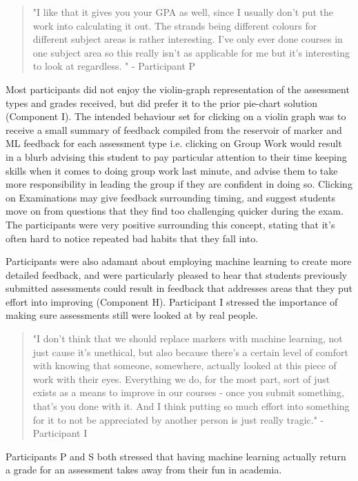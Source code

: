 \documentclass{l4proj}
\begin{document}
\begin{quote}
    "I like that it gives you your GPA as well, since I usually don't put the work into calculating it out. The strands being different colours for different subject areas is rather interesting. I've only ever done courses in one subject area so this really isn't as applicable for me but it's interesting to look at regardless. " - Participant P
\end{quote}

Most participants did not enjoy the violin-graph representation of the assessment types and grades received, but did prefer it to the prior pie-chart solution (Component I). The intended behaviour set for clicking on a violin graph was to receive a small summary of feedback compiled from the reservoir of marker and ML feedback for each assessment type i.e. clicking on Group Work would result in a blurb advising this student to pay particular attention to their time keeping skills when it comes to doing group work last minute, and advise them to take more responsibility in leading the group if they are confident in doing so. Clicking on Examinations may give feedback surrounding timing, and suggest students move on from questions that they find too challenging quicker during the exam. The participants were very positive surrounding this concept, stating that it's often hard to notice repeated bad habits that they fall into.

Participants were also adamant about employing machine learning to create more detailed feedback, and were particularly pleased to hear that students previously submitted assessments could result in feedback that addresses areas that they put effort into improving (Component H). Participant I stressed the importance of making sure assessments still were looked at by real people.

\begin{quote}
    "I don't think that we should replace markers with machine learning, not just cause it's unethical, but also because there's a certain level of comfort with knowing that someone, somewhere, actually looked at this piece of work with their eyes. Everything we do, for the most part, sort of just exists as a means to improve in our courses - once you submit something, that's you done with it. And I think putting so much effort into something for it to not be appreciated by another person is just really tragic." - Participant I
\end{quote}

Participants P and S both stressed that having machine learning actually return a grade for an assessment takes away from their fun in academia. 
\end{document}
